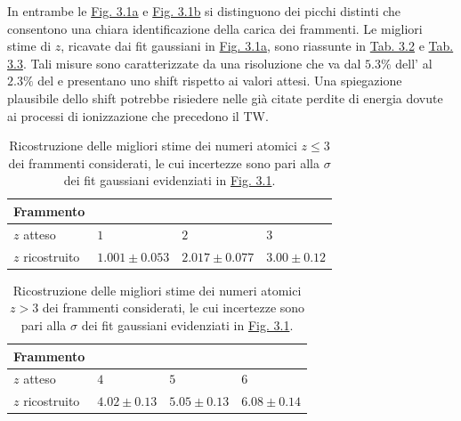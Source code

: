 \documentclass[12pt,a4paper,twoside]{report}
\begin{document}
	In entrambe le \hyperref[fig:atomic_numbersa]{Fig. 3.1a} e \hyperref[fig:atomic_numbersb]{Fig. 3.1b} si distinguono dei picchi distinti che consentono una chiara identificazione della carica dei frammenti. Le migliori stime di $z$, ricavate dai fit gaussiani in \hyperref[fig:atomic_numbersa]{Fig. 3.1a}, sono riassunte in \hyperref[tab:atomic_numbers_a]{Tab. 3.2} e \hyperref[tab:atomic_numbers_b]{Tab. 3.3}. Tali misure sono caratterizzate da una risoluzione che va dal $5.3\%$ dell' al $2.3\%$ del  e presentano uno shift rispetto ai valori attesi. Una spiegazione plausibile dello shift potrebbe risiedere nelle già citate perdite di energia dovute ai processi di ionizzazione che precedono il TW.
	\begin{table}[H]
		\begin{minipage}{\textwidth}
			\centering
			\begin{tabular}{ |M{3.5cm}||M{3.cm}|M{3.cm}|M{3.cm}| }
				\hline
				Frammento &&&\\
				\hline
				$z$ atteso & $1$& $2$& $3$\\
				\hline
				$z$ ricostruito & $1.001\pm0.053$& $2.017\pm0.077$ &$3.00\pm0.12$\\
				\hline
			\end{tabular}
		\end{minipage}
		\caption{Ricostruzione delle migliori stime dei numeri atomici $z\le3$ dei frammenti considerati, le cui incertezze sono pari alla $\sigma$ dei fit gaussiani evidenziati in \hyperref[fig:atomic_numbers]{Fig. 3.1}.}
		\label{tab:atomic_numbers_a}
	\end{table}
	\begin{table}[H]
		\begin{minipage}{\textwidth}
			\centering
			\begin{tabular}{ |M{3.5cm}||M{3.cm}|M{3.cm}|M{3.cm}| }
				\hline
				Frammento &&&\\
				\hline
				$z$ atteso & $4$& $5$& $6$\\
				\hline
				$z$ ricostruito & $4.02\pm0.13$& $5.05\pm0.13$ &$6.08\pm0.14$ \\
				\hline
			\end{tabular}
		\end{minipage}
		\caption{Ricostruzione delle migliori stime dei numeri atomici $z>3$ dei frammenti considerati, le cui incertezze sono pari alla $\sigma$ dei fit gaussiani evidenziati in \hyperref[fig:atomic_numbers]{Fig. 3.1}.}
		\label{tab:atomic_numbers_b}
	\end{table}
\end{document}
